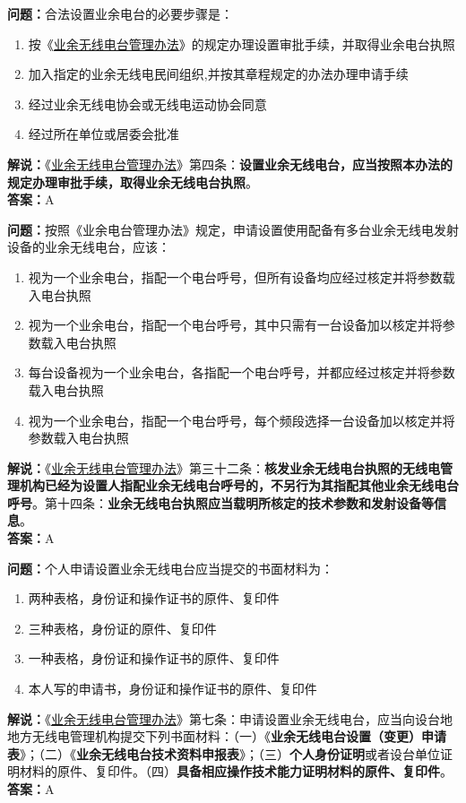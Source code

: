 \textbf{问题：}合法设置业余电台的必要步骤是：
\begin{enumerate}[label=\Alph*), leftmargin=1.5cm]
	\item 按《\href{https://www.miit.gov.cn/jgsj/zfs/bmgz/art/2020/art_147b69815b3641caad9047735f94c860.html}{业余无线电台管理办法}》的规定办理设置审批手续，并取得业余电台执照
	\item 加入指定的业余无线电民间组织,并按其章程规定的办法办理申请手续
	\item 经过业余无线电协会或无线电运动协会同意
	\item 经过所在单位或居委会批准
\end{enumerate}
\textbf{解说：}《\href{https://www.miit.gov.cn/jgsj/zfs/bmgz/art/2020/art_147b69815b3641caad9047735f94c860.html}{业余无线电台管理办法}》第四条：\textbf{设置业余无线电台，应当按照本办法的规定办理审批手续，取得业余无线电台执照}。\\\textbf{答案：}A

\textbf{问题：}按照《业余电台管理办法》规定，申请设置使用配备有多台业余无线电发射设备的业余无线电台，应该：
\begin{enumerate}[label=\Alph*), leftmargin=1.5cm]
	\item 视为一个业余电台，指配一个电台呼号，但所有设备均应经过核定并将参数载入电台执照
	\item 视为一个业余电台，指配一个电台呼号，其中只需有一台设备加以核定并将参数载入电台执照
	\item 每台设备视为一个业余电台，各指配一个电台呼号，并都应经过核定并将参数载入电台执照
	\item 视为一个业余电台，指配一个电台呼号，每个频段选择一台设备加以核定并将参数载入电台执照
\end{enumerate}
\textbf{解说：}《\href{https://www.miit.gov.cn/jgsj/zfs/bmgz/art/2020/art_147b69815b3641caad9047735f94c860.html}{业余无线电台管理办法}》第三十二条：\textbf{核发业余无线电台执照的无线电管理机构已经为设置人指配业余无线电台呼号的，不另行为其指配其他业余无线电台呼号}。第十四条：\textbf{业余无线电台执照应当载明所核定的技术参数和发射设备等信息}。\\\textbf{答案：}A

\textbf{问题：}个人申请设置业余无线电台应当提交的书面材料为：
\begin{enumerate}[label=\Alph*), leftmargin=1.5cm]
	\item 两种表格，身份证和操作证书的原件、复印件
	\item 三种表格，身份证的原件、复印件
	\item 一种表格，身份证和操作证书的原件、复印件
	\item 本人写的申请书，身份证和操作证书的原件、复印件
\end{enumerate}
\textbf{解说：}《\href{https://www.miit.gov.cn/jgsj/zfs/bmgz/art/2020/art_147b69815b3641caad9047735f94c860.html}{业余无线电台管理办法}》第七条：申请设置业余无线电台，应当向设台地地方无线电管理机构提交下列书面材料：（一）《\textbf{业余无线电台设置（变更）申请表}》；（二）《\textbf{业余无线电台技术资料申报表}》；（三）\textbf{个人身份证明}或者设台单位证明材料的原件、复印件。（四）\textbf{具备相应操作技术能力证明材料的原件、复印件}。\\\textbf{答案：}A

